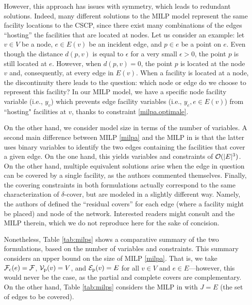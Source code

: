 However, this approach has issues with symmetry, which leads to  redundant solutions. Indeed, many different solutions to the MILP model represent the same facility locations to  the CSCP, since there exist many combinations of the edges ``hosting'' the facilities that are located at nodes. Let us consider an example: let $v \in V$ be a node, $e \in E(v)$ be an incident edge, and $p \in e$ be a point on $e$. Even though the distance $d(p,v)$ is equal to $ \epsilon $ for a very small $\epsilon > 0$, the point $p$ is still located at $e$. However, when $d(p,v) = 0$, the point $p$ is located at the node $v$ and, consequently, at every edge in $E(v)$. When a facility is located at a node, the discontinuity there leads to the question: which node or edge do we choose to represent this facility? In our MILP model, we have a specific node facility variable (i.e., $y_v$) which  prevents edge facility variables (i.e., $y_e, e \in E(v)$) from ``hosting" facilities at $v$, thanks to constraint \eqref{milpa.optimale}.


On the other hand, we consider model size in terms of the number of variables.  A second main difference between MILP \eqref{milpa} and the MILP in \cite{Hamacher20} is that the latter uses binary variables to identify the two edges containing the facilities that cover a given edge. On the one hand, this yields variables and constraints of ${\mathcal{O}(|E|^3)}$. On the other hand, multiple equivalent solutions arise when the edge in question can be covered by a single facility, as the authors commented themselves. Finally, the covering constraints in both formulations actually correspond to the same characterization of $\delta$-cover, but are modeled in a slightly different way. Namely, the authors of \cite{Hamacher20} defined the ``residual covers'' for each edge (where a facility might be placed) and node of the network. Interested readers might consult \cite{Hamacher20} and the MILP therein, which we do not reproduce here for the sake of concision.


Nonetheless, Table \ref{tab:milps} shows a comparative summary of the two formulations, based on the number of variables and constraints. This summary considers an upper bound on the size of MILP \eqref{milpa}. That is, we take $\mathcal F_{\mathrm{c}}(e)=\mathcal F$, $\mathcal V_{\mathrm{p}}(v)=V$, and ${\mathcal E}_{\mathrm{p}}(v)=E$ for all $v \in V$ and $e\in E$---however, this would never be the case, as the partial and complete covers are complementary. On the other hand, Table \ref{tab:milps}  considers the MILP in \cite{Hamacher20} with $J=E$ (the set of edges to be covered).


